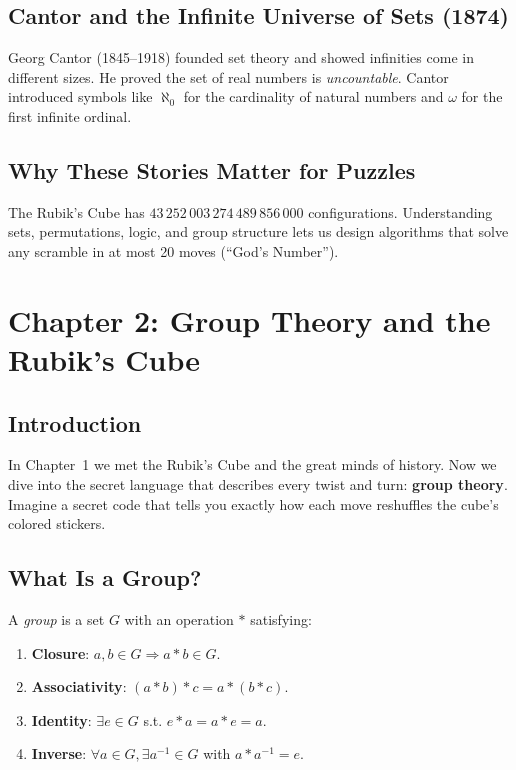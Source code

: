\documentclass[12pt]{article}
\begin{document}
\subsection*{Cantor and the Infinite Universe of Sets (1874)}

Georg Cantor (1845–1918) founded set theory and showed infinities come in different sizes. He proved the set of real numbers is \emph{uncountable}. Cantor introduced symbols like \(\aleph_0\) for the cardinality of natural numbers and \(\omega\) for the first infinite ordinal.

\subsection*{Why These Stories Matter for Puzzles}

The Rubik’s Cube has \(43\,252\,003\,274\,489\,856\,000\) configurations. Understanding sets, permutations, logic, and group structure lets us design algorithms that solve any scramble in at most 20 moves (“God’s Number”).

\newpage
\section*{Chapter 2: Group Theory and the Rubik's Cube}

\subsection*{Introduction}

In Chapter 1 we met the Rubik’s Cube and the great minds of history. Now we dive into the secret language that describes every twist and turn: \textbf{group theory}. Imagine a secret code that tells you exactly how each move reshuffles the cube’s colored stickers.

\subsection*{What Is a Group?}

A \emph{group} is a set \(G\) with an operation \(\ast\) satisfying:
\begin{enumerate}
  \item \textbf{Closure}: \(a,b\in G \Rightarrow a\ast b\in G\).
  \item \textbf{Associativity}: \((a\ast b)\ast c = a\ast(b\ast c)\).
  \item \textbf{Identity}: \(\exists e\in G\) s.t. \(e\ast a=a\ast e=a\).
  \item \textbf{Inverse}: \(\forall a\in G, \exists a^{-1}\in G\) with \(a\ast a^{-1}=e\).
\end{enumerate}
\end{document}
